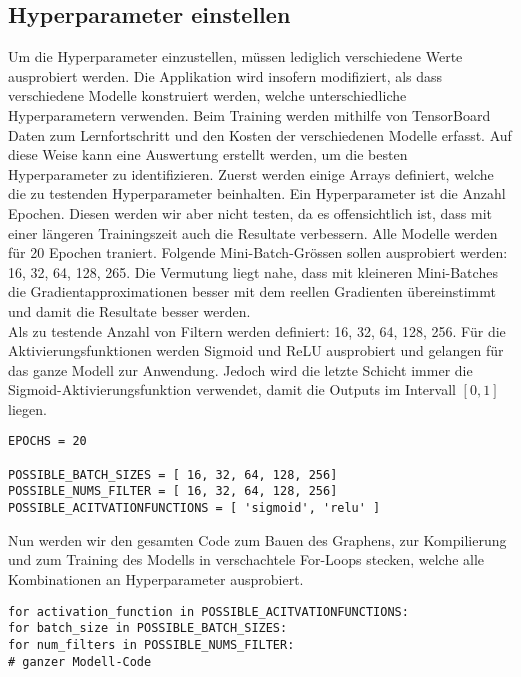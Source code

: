 \subsection{Hyperparameter einstellen}
Um die Hyperparameter einzustellen, müssen lediglich verschiedene Werte
ausprobiert werden. Die Applikation wird insofern modifiziert, als dass
verschiedene Modelle konstruiert werden, welche unterschiedliche
Hyperparametern verwenden.
Beim Training werden mithilfe von TensorBoard
Daten zum Lernfortschritt und den Kosten der verschiedenen Modelle erfasst. Auf
diese Weise kann eine Auswertung erstellt werden, um die besten Hyperparameter
zu identifizieren.
\para{}
Zuerst werden einige Arrays definiert, welche die zu testenden Hyperparameter beinhalten.
Ein Hyperparameter ist die Anzahl Epochen. Diesen werden wir aber nicht testen,
da es offensichtlich ist, dass mit einer längeren Trainingszeit auch die
Resultate verbessern.
Alle Modelle werden für 20 Epochen traniert.
\para{}
Folgende Mini-Batch-Grössen sollen ausprobiert werden: 16, 32, 64, 128, 265.
Die Vermutung liegt nahe, dass mit kleineren Mini-Batches die
Gradientapproximationen besser mit dem reellen Gradienten übereinstimmt und
damit die Resultate besser werden. \\
Als zu testende Anzahl von Filtern werden definiert: 16, 32, 64, 128, 256.
Für die Aktivierungsfunktionen werden Sigmoid und ReLU ausprobiert und gelangen
für das ganze Modell zur Anwendung.
Jedoch wird die letzte Schicht immer die
Sigmoid-Aktivierungsfunktion verwendet, damit die Outputs im Intervall $[0,1]$
liegen.

\begin{verbatim}
EPOCHS = 20

POSSIBLE_BATCH_SIZES = [ 16, 32, 64, 128, 256]
POSSIBLE_NUMS_FILTER = [ 16, 32, 64, 128, 256]
POSSIBLE_ACITVATIONFUNCTIONS = [ 'sigmoid', 'relu' ]
\end{verbatim}
Nun werden wir den gesamten Code zum Bauen des Graphens, zur Kompilierung und
zum Training des Modells in verschachtele For-Loops stecken, welche alle
Kombinationen an Hyperparameter ausprobiert.

\begin{verbatim}
for activation_function in POSSIBLE_ACITVATIONFUNCTIONS:
for batch_size in POSSIBLE_BATCH_SIZES:
for num_filters in POSSIBLE_NUMS_FILTER:
# ganzer Modell-Code
\end{verbatim}

